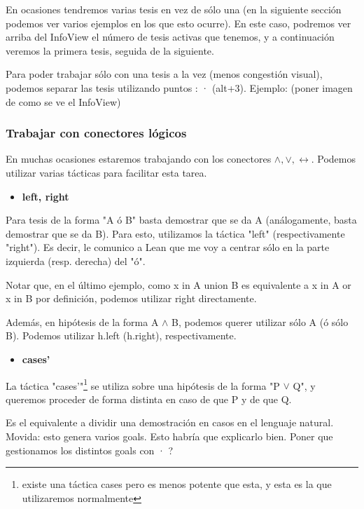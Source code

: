 \documentclass{article}
\begin{document}
En ocasiones tendremos varias tesis en vez de sólo una (en la siguiente sección podemos ver varios ejemplos en los que esto ocurre). En este caso, podremos ver arriba del InfoView el número de tesis activas que tenemos, y a continuación veremos la primera tesis, seguida de la siguiente.

Para poder trabajar sólo con una tesis a la vez (menos congestión visual), podemos separar las tesis utilizando puntos : · (alt+3). Ejemplo: (poner imagen de como se ve el InfoView)

\subsubsection{Trabajar con conectores lógicos}

En muchas ocasiones estaremos trabajando con los conectores $\land, \lor, \leftrightarrow$. Podemos utilizar varias tácticas para facilitar esta tarea.

\begin{itemize}
    \item \textbf{left, right}
\end{itemize}

Para tesis de la forma "A ó B" basta demostrar que se da A (análogamente, basta demostrar que se da B). Para esto, utilizamos la táctica "left" (respectivamente "right"). Es decir, le comunico a Lean que me voy a centrar sólo en la parte izquierda (resp. derecha) del "ó".


Notar que, en el último ejemplo, como x in A union B es equivalente a x in A or x in B por definición, podemos utilizar right directamente.

Además, en hipótesis de la forma A $\land$ B, podemos querer utilizar sólo A (ó sólo B). Podemos utilizar h.left (h.right), respectivamente.

\begin{itemize}
    \item \textbf{cases'}
\end{itemize}

La táctica "cases'"\footnote{existe una táctica cases pero es menos potente que esta, y esta es la que utilizaremos normalmente} se utiliza sobre una hipótesis de la forma "P $\lor$ Q", y queremos proceder de forma distinta en caso de que P y de que Q.

Es el equivalente a dividir una demostración en casos en el lenguaje natural. Movida: esto genera varios goals. Esto habría que explicarlo bien. Poner que gestionamos los distintos goals con · ?
\end{document}

